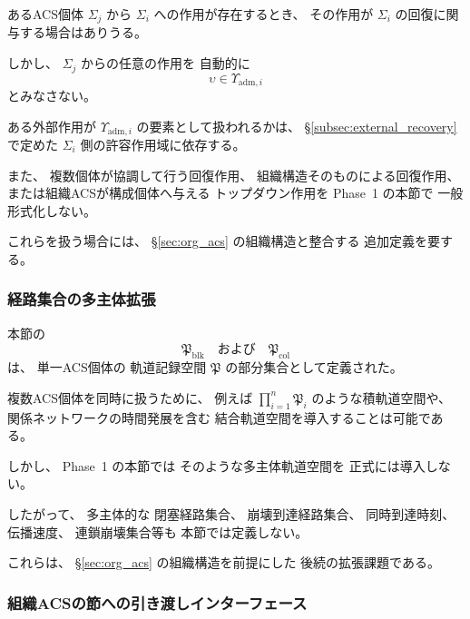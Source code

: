 \begin{remark}
\label{rem:multi_agent_recovery_scope}
あるACS個体
$\Sigma_j$
から
$\Sigma_i$
への作用が存在するとき、
その作用が
$\Sigma_i$ の回復に関与する場合はありうる。

しかし、
$\Sigma_j$ からの任意の作用を
自動的に
\[
  \upsilon\in\Upsilon_{\mathrm{adm},i}
\]
とみなさない。

ある外部作用が
$\Upsilon_{\mathrm{adm},i}$
の要素として扱われるかは、
\S\ref{subsec:external_recovery}
で定めた
$\Sigma_i$ 側の許容作用域に依存する。

また、
複数個体が協調して行う回復作用、
組織構造そのものによる回復作用、
または組織ACSが構成個体へ与える
トップダウン作用を
Phase~1 の本節で
一般形式化しない。

これらを扱う場合には、
\S\ref{sec:org_acs}
の組織構造と整合する
追加定義を要する。
\end{remark}

\subsubsection{経路集合の多主体拡張}

\begin{remark}[経路集合の多主体的拡張は本節で導入しない]
\label{rem:path_set_multi_agent}
本節の
\[
  \mathfrak{P}_{\mathrm{blk}}
  \quad\text{および}\quad
  \mathfrak{P}_{\mathrm{col}}
\]
は、
単一ACS個体の
軌道記録空間
$\mathfrak{P}$
の部分集合として定義された。

複数ACS個体を同時に扱うために、
例えば
$\prod_{i=1}^{n}\mathfrak{P}_i$
のような積軌道空間や、
関係ネットワークの時間発展を含む
結合軌道空間を導入することは可能である。

しかし、
Phase~1 の本節では
そのような多主体軌道空間を
正式には導入しない。

したがって、
多主体的な
閉塞経路集合、
崩壊到達経路集合、
同時到達時刻、
伝播速度、
連鎖崩壊集合等も
本節では定義しない。

これらは、
\S\ref{sec:org_acs}
の組織構造を前提にした
後続の拡張課題である。
\end{remark}

\subsubsection{組織ACSの節への引き渡しインターフェース}

